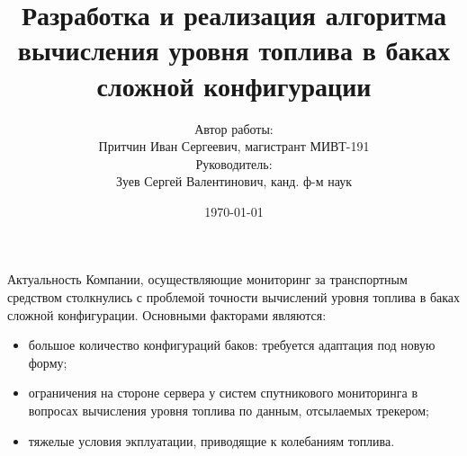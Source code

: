 \documentclass[usenames,dvipsnames,11pt]{beamer}
\title[БГТУ им. В.Г.Шухова]{Разработка и реализация алгоритма вычисления уровня топлива в баках сложной конфигурации}
\date[\today]{\small\today}
\author[Иван Притчин]{
		Автор работы:\\
		Притчин Иван Сергеевич, магистрант МИВТ-191 \\
		\vspace{0.3cm}
		Руководитель:\\
		Зуев Сергей Валентинович, канд. ф-м наук\\	
	}
\institute{Кафедра программного обеспечения ВТ и АС}
\begin{document}
\begin{frame}
  \titlepage
\end{frame}

\begin{frame}{Актуальность}
	Компании, осуществляющие мониторинг за транспортным средством столкнулись с проблемой точности вычислений уровня топлива в баках сложной конфигурации. 
	\bigbreak
	Основными факторами являются:
	\begin{itemize}
		\item большое количество конфигураций баков: требуется адаптация под новую форму;
		\item ограничения на стороне сервера у систем спутникового мониторинга в вопросах вычисления уровня топлива по данным, отсылаемых трекером;
		\item тяжелые условия экплуатации, приводящие к колебаниям топлива.
	\end{itemize}
\end{frame}
\end{document}
